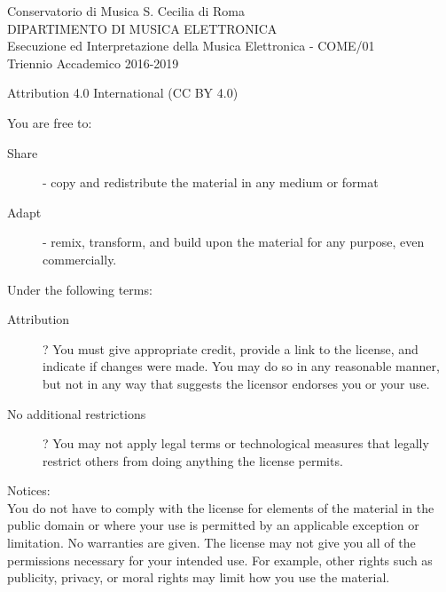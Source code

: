 
\thispagestyle{empty}

Conservatorio di Musica S. Cecilia di Roma \\
DIPARTIMENTO DI MUSICA ELETTRONICA \\
Esecuzione ed Interpretazione della Musica Elettronica - COME/01 \\
Triennio Accademico 2016-2019
\vfill

Attribution 4.0 International (CC BY 4.0)

You are free to:
\begin{description}
	\item[Share] - copy and redistribute the material in any medium or format
	\item[Adapt] - remix, transform, and build upon the material for any purpose, even commercially.
\end{description}

Under the following terms:
\begin{description}
	\item[Attribution] ? You must give appropriate credit, provide a link to the license, and indicate if
	changes were made. You may do so in any reasonable manner, but not in any way that suggests the licensor
	endorses you or your use.
	\item[No additional restrictions] ? You may not apply legal terms or technological measures that legally
	restrict others from doing anything the license permits.
\end{description}

Notices:\\
You do not have to comply with the license for elements of the material in the public domain or where your
use is permitted by an applicable exception or limitation. No warranties are given. The license may not give
you all of the permissions necessary for your intended use. For example, other rights such as publicity,
privacy, or moral rights may limit how you use the material.